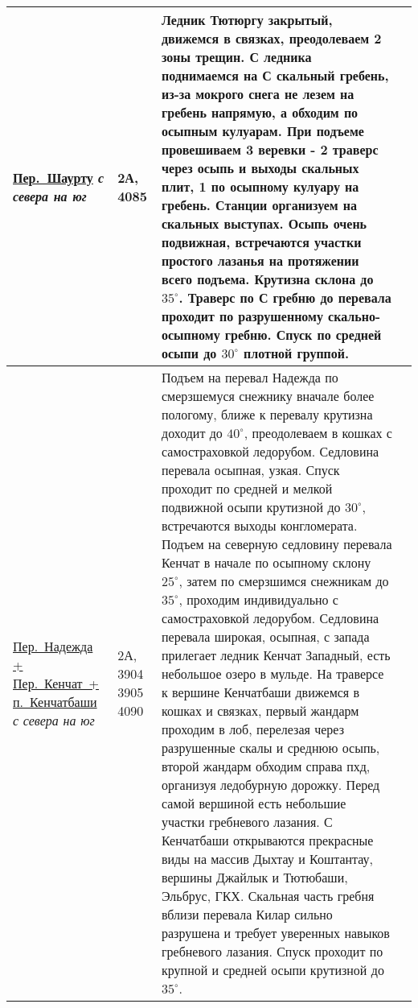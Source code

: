 {\begin{longtable}{|>{\centering\arraybackslash}m{4.5cm}|>{\centering\arraybackslash}m{1.8cm}|>{\raggedright\arraybackslash}m{9.6cm}|>{\centering\arraybackslash}m{1.2cm}|}
			\hyperref[subsec:Day12]{{\small Пер.~Шаурту}}																	\newline\textit{с севера на юг}			&	2А,	4085					&	{\small Ледник Тютюргу закрытый, движемся в связках, преодолеваем 2 зоны трещин. С ледника поднимаемся на С скальный гребень, из-за мокрого снега не лезем на гребень напрямую, а обходим по осыпным кулуарам. При подъеме провешиваем 3 веревки - 2 траверс через осыпь и выходы скальных плит, 1 по осыпному кулуару на гребень. Станции организуем на скальных выступах. Осыпь очень подвижная, встречаются участки простого лазанья на протяжении всего подъема. Крутизна склона до $35^\circ$. Траверс по С гребню до перевала проходит по разрушенному скально-осыпному гребню. Спуск по средней осыпи до $30^\circ$ плотной группой.}																																																																																																																																																																																					&			\\ \hline
			\hyperref[subsec:Day16]{{\small Пер.~Надежда + Пер.~Кенчат~+ п.~Кенчатбаши}}									\newline\textit{с севера на юг}			&	2А, 3904 3905 4090	&	{\small Подъем на перевал Надежда по смерзшемуся снежнику вначале более пологому, ближе к перевалу крутизна доходит до $40^\circ$, преодолеваем в кошках с самостраховкой ледорубом. Седловина перевала осыпная, узкая. Спуск проходит по средней и мелкой подвижной осыпи крутизной до $30^\circ$, встречаются выходы конгломерата. Подъем на северную седловину перевала Кенчат в начале по осыпному склону $25^\circ$, затем по смерзшимся снежникам до $35^\circ$, проходим индивидуально с самостраховкой ледорубом. Седловина перевала широкая, осыпная, с запада прилегает ледник Кенчат Западный, есть небольшое озеро в мульде. На траверсе к вершине Кенчатбаши движемся в кошках и связках, первый жандарм проходим в лоб, перелезая через разрушенные скалы и среднюю осыпь, второй жандарм обходим справа пхд, организуя ледобурную дорожку. Перед самой вершиной есть небольшие участки гребневого лазания. С Кенчатбаши открываются прекрасные виды на массив Дыхтау и Коштантау, вершины Джайлык и Тютюбаши, Эльбрус, ГКХ. Скальная часть гребня вблизи перевала Килар сильно разрушена и требует уверенных навыков гребневого лазания. Спуск проходит по крупной и средней осыпи крутизной до $35^\circ$.}																																										&			\\ \hline

\end{longtable}}

